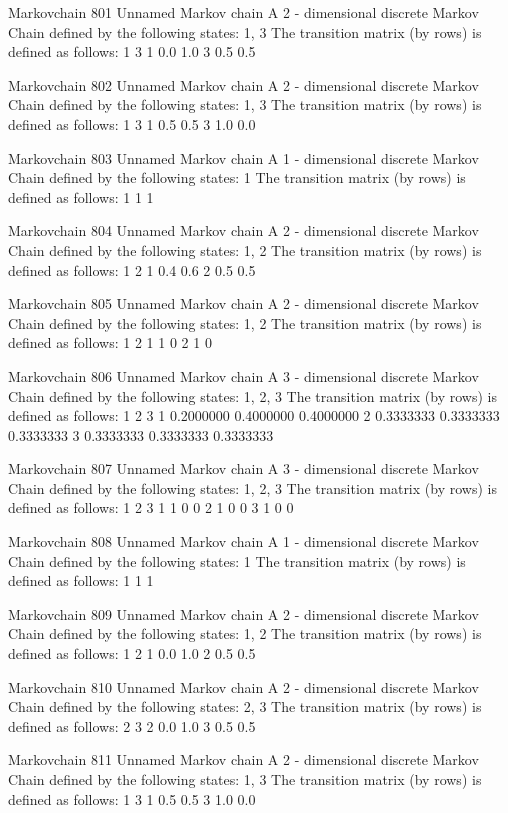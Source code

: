 \documentclass[
  nojss]{jss}
\begin{document}
\begin{CodeChunk}
\begin{CodeOutput}
Markovchain  801 
Unnamed Markov chain 
 A  2 - dimensional discrete Markov Chain defined by the following states: 
 1, 3 
 The transition matrix  (by rows)  is defined as follows: 
    1   3
1 0.0 1.0
3 0.5 0.5

Markovchain  802 
Unnamed Markov chain 
 A  2 - dimensional discrete Markov Chain defined by the following states: 
 1, 3 
 The transition matrix  (by rows)  is defined as follows: 
    1   3
1 0.5 0.5
3 1.0 0.0

Markovchain  803 
Unnamed Markov chain 
 A  1 - dimensional discrete Markov Chain defined by the following states: 
 1 
 The transition matrix  (by rows)  is defined as follows: 
  1
1 1

Markovchain  804 
Unnamed Markov chain 
 A  2 - dimensional discrete Markov Chain defined by the following states: 
 1, 2 
 The transition matrix  (by rows)  is defined as follows: 
    1   2
1 0.4 0.6
2 0.5 0.5

Markovchain  805 
Unnamed Markov chain 
 A  2 - dimensional discrete Markov Chain defined by the following states: 
 1, 2 
 The transition matrix  (by rows)  is defined as follows: 
  1 2
1 1 0
2 1 0

Markovchain  806 
Unnamed Markov chain 
 A  3 - dimensional discrete Markov Chain defined by the following states: 
 1, 2, 3 
 The transition matrix  (by rows)  is defined as follows: 
          1         2         3
1 0.2000000 0.4000000 0.4000000
2 0.3333333 0.3333333 0.3333333
3 0.3333333 0.3333333 0.3333333

Markovchain  807 
Unnamed Markov chain 
 A  3 - dimensional discrete Markov Chain defined by the following states: 
 1, 2, 3 
 The transition matrix  (by rows)  is defined as follows: 
  1 2 3
1 1 0 0
2 1 0 0
3 1 0 0

Markovchain  808 
Unnamed Markov chain 
 A  1 - dimensional discrete Markov Chain defined by the following states: 
 1 
 The transition matrix  (by rows)  is defined as follows: 
  1
1 1

Markovchain  809 
Unnamed Markov chain 
 A  2 - dimensional discrete Markov Chain defined by the following states: 
 1, 2 
 The transition matrix  (by rows)  is defined as follows: 
    1   2
1 0.0 1.0
2 0.5 0.5

Markovchain  810 
Unnamed Markov chain 
 A  2 - dimensional discrete Markov Chain defined by the following states: 
 2, 3 
 The transition matrix  (by rows)  is defined as follows: 
    2   3
2 0.0 1.0
3 0.5 0.5

Markovchain  811 
Unnamed Markov chain 
 A  2 - dimensional discrete Markov Chain defined by the following states: 
 1, 3 
 The transition matrix  (by rows)  is defined as follows: 
    1   3
1 0.5 0.5
3 1.0 0.0


\end{CodeOutput}
\end{CodeChunk}
\end{document}
